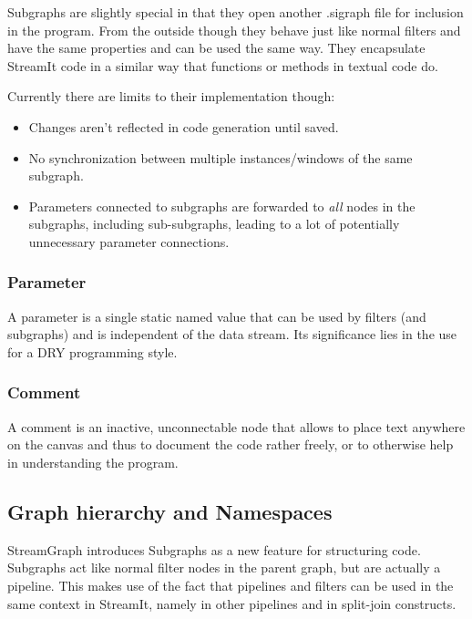 \documentclass[journal]{IEEEtran}
\begin{document}
Subgraphs are slightly special in that they open another .sigraph file for
inclusion in the program. From the outside though they behave just like normal
filters and have the same properties and can be used the same way. They
encapsulate StreamIt code in a similar way that functions or methods in
textual code do.

Currently there are limits to their implementation though:

\begin{itemize}

\item Changes aren't reflected in code generation until saved.

\item No synchronization between multiple instances/windows of the same subgraph.

\item Parameters connected to subgraphs are forwarded to \emph{all} nodes in
the subgraphs, including sub-subgraphs, leading to a lot of potentially
unnecessary parameter connections.

\end{itemize}

\subsubsection{Parameter}

A parameter is a single static named value that can be used by filters (and
subgraphs) and is independent of the data stream. Its significance lies in the
use for a DRY programming style.

\subsubsection{Comment}

A comment is an inactive, unconnectable node that allows to place text
anywhere on the canvas and thus to document the code rather freely, or to
otherwise help in understanding the program.



\subsection{Graph hierarchy and Namespaces}

\noindent StreamGraph introduces Subgraphs as a new feature for structuring
code. Subgraphs act like normal filter nodes in the parent graph, but are
actually a pipeline. This makes use of the fact that pipelines and filters can
be used in the same context in StreamIt, namely in other pipelines and in
split-join constructs.
\end{document}
